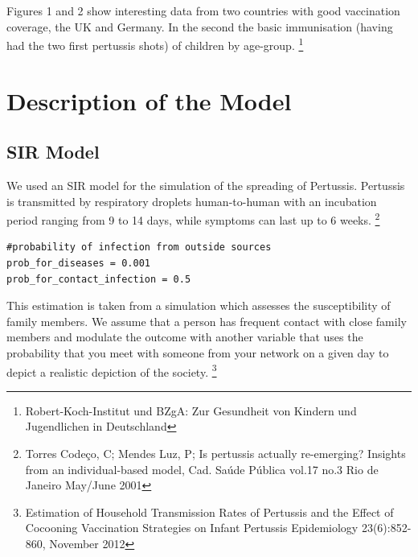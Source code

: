 \documentclass[11pt]{article}
\begin{document}
Figures 1 and 2 show interesting data from two countries with good vaccination coverage, the UK and Germany. In the second the basic immunisation (having had the two first pertussis shots) of children by age-group. \footnote{Robert-Koch-Institut und BZgA: Zur Gesundheit von Kindern und Jugendlichen in Deutschland}



\section{Description of the Model}

\subsection{SIR Model}

We used an SIR model for the simulation of the spreading of Pertussis. Pertussis is transmitted by respiratory droplets human-to-human with an incubation period ranging from 9 to 14 days, while symptoms can last up to 6 weeks. \footnote{Torres Codeço, C; Mendes Luz, P; Is pertussis actually re-emerging? Insights from an individual-based model, Cad. Saúde Pública vol.17 no.3 Rio de Janeiro May/June 2001}

\begin{lstlisting}
#probability of infection from outside sources
prob_for_diseases = 0.001 
prob_for_contact_infection = 0.5
\end{lstlisting}

This estimation is taken from a simulation which assesses the susceptibility of family members. We assume that a person has frequent contact with close family members and modulate the outcome with another variable that uses the probability that you meet with someone from your network on a given day to depict a realistic depiction of the society. 
\footnote{Estimation of Household Transmission Rates of Pertussis and the Effect of Cocooning Vaccination Strategies on Infant Pertussis Epidemiology 23(6):852-860, November 2012}
\vspace{14px}
\end{document}
